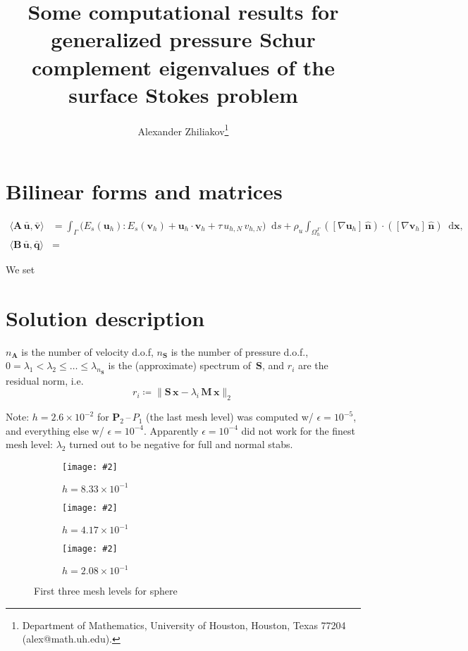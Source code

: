 \documentclass[12pt]{article}
\title{Some computational results for generalized pressure Schur complement eigenvalues of the surface Stokes problem}
\author{
	Alexander Zhiliakov\thanks{Department of Mathematics, University of Houston, Houston, Texas 77204 (alex@math.uh.edu).}
}
\newcommand{\includegraphicsw}[2][1.]{\texttt{[image: \#2]}}
\newcommand{\vect}[1]{\boldsymbol{\mathbf{#1}}}
\newcommand*\diff{\mathop{}\!\mathrm{d}}
\begin{document}
	
\maketitle
	
\let\oldtabular\tabular
\renewcommand{\tabular}[1][1.5]{\def\arraystretch{#1}\oldtabular}

\section{Bilinear forms and matrices}

\begin{align}
	\langle \vect A\,\bar{\vect u}, \bar{\vect v} \rangle &= 
		\int_{\Gamma} \big( E_s(\vect u_h) : E_s(\vect v_h) + \vect u_h\cdot\vect v_h + \tau\,u_{h,N}\,v_{h,N} \big) \diff{s} + 
		\rho_u \int_{\Omega_h^{\Gamma}} ([\nabla\vect u_h]\,\hat{\vect n})\cdot([\nabla\vect v_h]\,\hat{\vect n}) \diff{\vect x}, \\
	\langle \vect B\,\bar{\vect u}, \bar{\vect q} \rangle &= 
\end{align}

We set 

\section{Solution description}

$n_{\vect A}$ is the number of velocity d.o.f, $n_{\vect S}$ is the number of pressure d.o.f., $0 = \lambda_1 < \lambda_2 \le \dots \le \lambda_{n_{\vect S}}$ is the (approximate) spectrum of~$\vect S$, and $r_i$ are the residual norm, i.e.
$$
	r_i \coloneqq \| \vect S\,\vect x - \lambda_i\,\vect M\,\vect x \|_2
$$ 

Note: $h = 2.6\times10^{-2}$ for $\vect P_2$\,--\,$P_1$ (the last mesh level) was computed w/ $\epsilon = 10^{-5}$, and everything else w/ $\epsilon = 10^{-4}$. Apparently $\epsilon = 10^{-4}$ did not work for the finest mesh level: $\lambda_2$ turned out to be negative for full and normal stabs.
	
\begin{figure}[h]
	\centering
	\begin{subfigure}{.33\linewidth}
		\centering
		\includegraphicsw{lvl1.png}
		\caption{$h = 8.33\times10^{-1}$}
	\end{subfigure}%
	\begin{subfigure}{.33\linewidth}
		\centering
		\includegraphicsw{lvl2.png}
		\caption{$h = 4.17\times10^{-1}$}
	\end{subfigure}%
	\begin{subfigure}{.33\linewidth}
		\centering
		\includegraphicsw{lvl3.png}
		\caption{$h = 2.08\times10^{-1}$}
	\end{subfigure}
	\caption{First three mesh levels for sphere}
	\label{fig:sphere}		
\end{figure}
\end{document}
